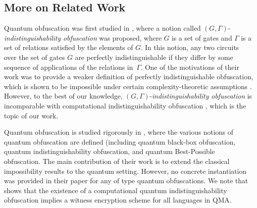 \subsection{More on Related Work}
\label{sec:obf-quantum}
Quantum obfuscation was first studied in \cite{AJJ14}, where a notion called
$(G,\Gamma)$-{\em indistinguishability obfuscation} was proposed,  where $G$ is a set of gates and $\Gamma$ is a set of relations satisfied by the elements of $G$. In this notion, any two circuits over the set of gates $G$ are perfectly indistinguishable if they differ by some sequence of applications of the relations in~$\Gamma.$ One of the motivations of their work was to provide a weaker definition of perfectly indistinguishable obfuscation, which is shown to be impossible under certain complexity-theoretic assumptions \cite{AJJ14}. However, to the best of our knowledge, $(G,\Gamma)$-{\em indistinguishability obfuscation} is  incomparable with  computational indistinguishability obfuscation \cite{BGI+12, GGH+13}, which is the topic of our work.

Quantum obfuscation is studied rigorously in \cite{AF16arxiv}, where the various notions of quantum obfuscation are defined (including quantum black-box obfuscation, quantum indistinguishability obfuscation, and quantum Best-Possible obfuscation.
%
 The main contribution of their work is to extend the classical impossibility results to the quantum setting.
 However, no concrete instantiation was provided in their paper for any of type quantum obfuscations.
  We note that  \cite{AF16arxiv} shows that the existence of a computational quantum indistinguishability obfuscation implies a witness encryption scheme for all languages in \textsf{QMA}.


%
%


